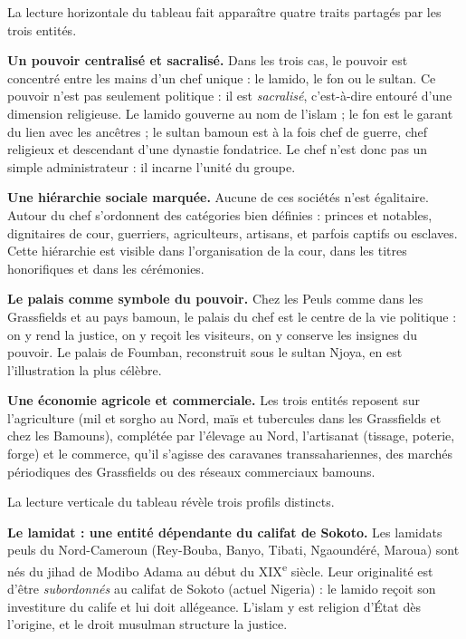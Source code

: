 \documentclass[11pt]{article}
\newcommand{\cle}[1]{{\popxbold\color{popdark}#1}}
\newcounter{popsec}
\newcounter{popsub}
\newcommand{\courssub}[1]{%
  \stepcounter{popsub}%
  \par\vspace{9pt}\noindent{\popxbold\fontsize{11.5}{13}\selectfont\color{popink}{\color{poporange}\thepopsec.\thepopsub}\hspace{6pt}#1}\par\nopagebreak\vspace{4pt}
}
\begin{document}
\courssub{Les points communs}

La lecture horizontale du tableau fait apparaître quatre traits partagés par les trois entités.

\textbf{Un pouvoir centralisé et sacralisé.} Dans les trois cas, le pouvoir est concentré entre les mains d'un chef unique : le \cle{lamido}, le \cle{fon} ou le \cle{sultan}. Ce pouvoir n'est pas seulement politique : il est \emph{sacralisé}, c'est-à-dire entouré d'une dimension religieuse. Le lamido gouverne au nom de l'islam ; le fon est le garant du lien avec les ancêtres ; le sultan bamoun est à la fois chef de guerre, chef religieux et descendant d'une dynastie fondatrice. Le chef n'est donc pas un simple administrateur : il incarne l'unité du groupe.

\textbf{Une hiérarchie sociale marquée.} Aucune de ces sociétés n'est égalitaire. Autour du chef s'ordonnent des catégories bien définies : princes et notables, dignitaires de cour, guerriers, agriculteurs, artisans, et parfois captifs ou esclaves. Cette hiérarchie est visible dans l'organisation de la cour, dans les titres honorifiques et dans les cérémonies.

\textbf{Le palais comme symbole du pouvoir.} Chez les Peuls comme dans les Grassfields et au pays bamoun, le palais du chef est le centre de la vie politique : on y rend la justice, on y reçoit les visiteurs, on y conserve les insignes du pouvoir. Le palais de Foumban, reconstruit sous le sultan \cle{Njoya}, en est l'illustration la plus célèbre.

\textbf{Une économie agricole et commerciale.} Les trois entités reposent sur l'agriculture (mil et sorgho au Nord, maïs et tubercules dans les Grassfields et chez les Bamouns), complétée par l'élevage au Nord, l'artisanat (tissage, poterie, forge) et le commerce, qu'il s'agisse des caravanes transsahariennes, des marchés périodiques des Grassfields ou des réseaux commerciaux bamouns.

\courssub{Les différences}

La lecture verticale du tableau révèle trois profils distincts.

\textbf{Le lamidat : une entité dépendante du califat de Sokoto.} Les lamidats peuls du Nord-Cameroun (Rey-Bouba, Banyo, Tibati, Ngaoundéré, Maroua) sont nés du jihad de \cle{Modibo Adama} au début du XIX\textsuperscript{e} siècle. Leur originalité est d'être \emph{subordonnés} au califat de \cle{Sokoto} (actuel Nigeria) : le lamido reçoit son investiture du calife et lui doit allégeance. L'islam y est religion d'État dès l'origine, et le droit musulman structure la justice.
\end{document}
